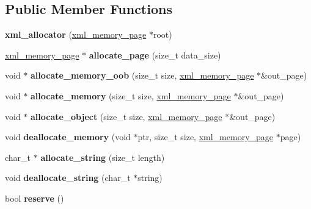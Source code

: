 \subsection*{Public Member Functions}
\begin{DoxyCompactItemize}
\item 
\mbox{\label{structxml__allocator_ad41b1a18595953aa71a470b45921c0fd}} 
{\bfseries xml\+\_\+allocator} (\hyperlink{structxml__memory__page}{xml\+\_\+memory\+\_\+page} $\ast$root)
\item 
\mbox{\label{structxml__allocator_a4b399b01e530220ec5849b912b84063b}} 
\hyperlink{structxml__memory__page}{xml\+\_\+memory\+\_\+page} $\ast$ {\bfseries allocate\+\_\+page} (size\+\_\+t data\+\_\+size)
\item 
\mbox{\label{structxml__allocator_a30bb557bc040de54c041c6d3dca6772e}} 
void $\ast$ {\bfseries allocate\+\_\+memory\+\_\+oob} (size\+\_\+t size, \hyperlink{structxml__memory__page}{xml\+\_\+memory\+\_\+page} $\ast$\&out\+\_\+page)
\item 
\mbox{\label{structxml__allocator_afac0b9fac2c2962972f60d0346eb4f39}} 
void $\ast$ {\bfseries allocate\+\_\+memory} (size\+\_\+t size, \hyperlink{structxml__memory__page}{xml\+\_\+memory\+\_\+page} $\ast$\&out\+\_\+page)
\item 
\mbox{\label{structxml__allocator_a5c7a0614c72c3e73f561bb3f98c314e0}} 
void $\ast$ {\bfseries allocate\+\_\+object} (size\+\_\+t size, \hyperlink{structxml__memory__page}{xml\+\_\+memory\+\_\+page} $\ast$\&out\+\_\+page)
\item 
\mbox{\label{structxml__allocator_a5df417155487cce4e0460b123ac33dc6}} 
void {\bfseries deallocate\+\_\+memory} (void $\ast$ptr, size\+\_\+t size, \hyperlink{structxml__memory__page}{xml\+\_\+memory\+\_\+page} $\ast$page)
\item 
\mbox{\label{structxml__allocator_ac5ec2b5d41672d6494a2742e95e525b3}} 
char\+\_\+t $\ast$ {\bfseries allocate\+\_\+string} (size\+\_\+t length)
\item 
\mbox{\label{structxml__allocator_af32c538db4d562c2d0bfe15f7c0aa879}} 
void {\bfseries deallocate\+\_\+string} (char\+\_\+t $\ast$string)
\item 
\mbox{\label{structxml__allocator_ac831a283ec3bcbe22fd3ce3be98ec347}} 
bool {\bfseries reserve} ()
\end{DoxyCompactItemize}
